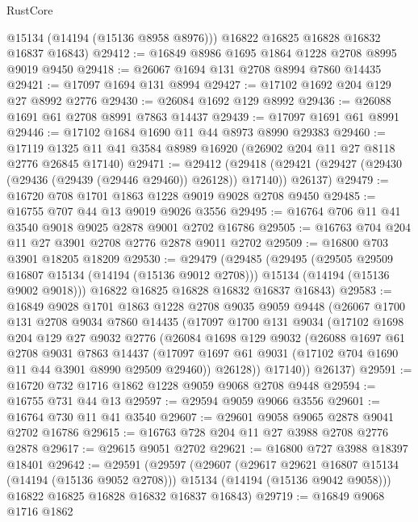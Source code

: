 \begin{lexlean}{RustCore}
\begin{coremodule}
        @15134
        (@14194 (@15136 @8958 @8976)))
      @16822
      @16825
      @16828
      @16832
      @16837
      @16843)
@29412 := @16849 @8986 @1695 @1864 @1228 @2708 @8995 @9019 @9450
@29418 := @26067 @1694 @131 @2708 @8994 @7860 @14435
@29421 := @17097 @1694 @131 @8994
@29427 := @17102 @1692 @204 @129 @27 @8992 @2776
@29430 := @26084 @1692 @129 @8992
@29436 := @26088 @1691 @61 @2708 @8991 @7863 @14437
@29439 := @17097 @1691 @61 @8991
@29446 := @17102 @1684 @1690 @11 @44 @8973 @8990 @29383
@29460 := @17119 @1325 @11 @41 @3584 @8989 @16920 (@26902 @204 @11 @27 @8118 @2776 @26845 @17140)
@29471 := @29412
    (@29418 (@29421 (@29427 (@29430 (@29436 (@29439 (@29446 @29460)) @26128)) @17140)) @26137)
@29479 := @16720 @708 @1701 @1863 @1228 @9019 @9028 @2708 @9450
@29485 := @16755 @707 @44 @13 @9019 @9026 @3556
@29495 := @16764 @706 @11 @41 @3540 @9018 @9025 @2878 @9001 @2702 @16786
@29505 := @16763 @704 @204 @11 @27 @3901 @2708 @2776 @2878 @9011 @2702
@29509 := @16800 @703 @3901 @18205 @18209
@29530 := @29479
    (@29485
      (@29495
        (@29505 @29509 @16807 @15134 (@14194 (@15136 @9012 @2708)))
        @15134
        (@14194 (@15136 @9002 @9018)))
      @16822
      @16825
      @16828
      @16832
      @16837
      @16843)
@29583 := @16849
    @9028
    @1701
    @1863
    @1228
    @2708
    @9035
    @9059
    @9448
    (@26067
      @1700
      @131
      @2708
      @9034
      @7860
      @14435
      (@17097
        @1700
        @131
        @9034
        (@17102
          @1698
          @204
          @129
          @27
          @9032
          @2776
          (@26084
            @1698
            @129
            @9032
            (@26088
              @1697
              @61
              @2708
              @9031
              @7863
              @14437
              (@17097 @1697 @61 @9031 (@17102 @704 @1690 @11 @44 @3901 @8990 @29509 @29460))
              @26128))
          @17140))
      @26137)
@29591 := @16720 @732 @1716 @1862 @1228 @9059 @9068 @2708 @9448
@29594 := @16755 @731 @44 @13
@29597 := @29594 @9059 @9066 @3556
@29601 := @16764 @730 @11 @41 @3540
@29607 := @29601 @9058 @9065 @2878 @9041 @2702 @16786
@29615 := @16763 @728 @204 @11 @27 @3988 @2708 @2776 @2878
@29617 := @29615 @9051 @2702
@29621 := @16800 @727 @3988 @18397 @18401
@29642 := @29591
    (@29597
      (@29607
        (@29617 @29621 @16807 @15134 (@14194 (@15136 @9052 @2708)))
        @15134
        (@14194 (@15136 @9042 @9058)))
      @16822
      @16825
      @16828
      @16832
      @16837
      @16843)
@29719 := @16849
    @9068
    @1716
    @1862

\end{coremodule}
\end{lexlean}

